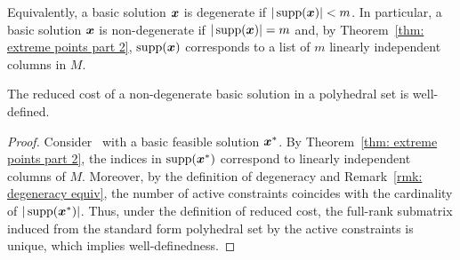 \begin{remark}\label{rmk: degeneracy equiv}
Equivalently, a basic solution ${\boldsymbol x}$ is degenerate if $|\operatorname{supp}({\boldsymbol x})| < m$. In particular, a basic solution ${\boldsymbol x}$ is non-degenerate if $|\operatorname{supp}({\boldsymbol x})| = m$ and, by Theorem~\ref{thm: extreme points part 2}, $\operatorname{supp}({\boldsymbol x})$ corresponds to a list of $m$ linearly independent columns in $M$. 
\end{remark}

\begin{lemma}\label{lemma: reduced cost well-definedness}
The reduced cost of a non-degenerate basic solution in a polyhedral set is well-defined. 
\end{lemma}
\begin{proof}
Consider \LPSA~with a basic feasible solution ${\boldsymbol x}^\ast$. By Theorem~\ref{thm: extreme points part 2}, the indices in $\operatorname{supp}({\boldsymbol x}^\ast)$ correspond to linearly independent columns of $M$. Moreover, by the definition of degeneracy and Remark~\ref{rmk: degeneracy equiv}, the number of active constraints coincides with the cardinality of $|\operatorname{supp}({\boldsymbol x}^\ast)|$. Thus, under the definition of reduced cost, the full-rank submatrix induced from the standard form polyhedral set by the active constraints is unique, which implies well-definedness. 
\end{proof}


